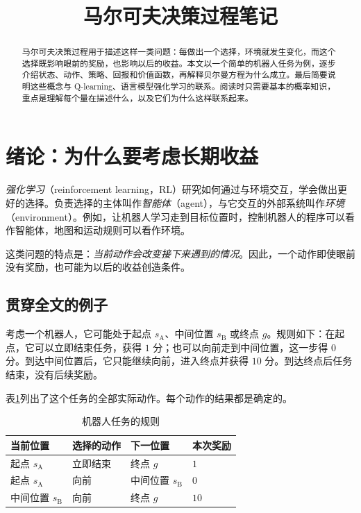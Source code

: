\documentclass[UTF8,12pt,a4paper,fontset=fandol]{ctexart}
\title{马尔可夫决策过程笔记}
\author{}
\date{}
\begin{document}
\maketitle

\begin{abstract}
马尔可夫决策过程用于描述这样一类问题：每做出一个选择，环境就发生变化，而这个选择既影响眼前的奖励，也影响以后的收益。本文以一个简单的机器人任务为例，逐步介绍状态、动作、策略、回报和价值函数，再解释贝尔曼方程为什么成立。最后简要说明这些概念与 Q-learning、语言模型强化学习的联系。阅读时只需要基本的概率知识，重点是理解每个量在描述什么，以及它们为什么这样联系起来。
\end{abstract}

\tableofcontents

\section{绪论：为什么要考虑长期收益}
\label{sec:mdp-introduction}

\emph{强化学习}（reinforcement learning，RL）研究如何通过与环境交互，学会做出更好的选择。负责选择的主体叫作\emph{智能体}（agent），与它交互的外部系统叫作\emph{环境}（environment）。例如，让机器人学习走到目标位置时，控制机器人的程序可以看作智能体，地图和运动规则可以看作环境。

这类问题的特点是：\emph{当前动作会改变接下来遇到的情况}。因此，一个动作即使眼前没有奖励，也可能为以后的收益创造条件。

\subsection{贯穿全文的例子}

考虑一个机器人，它可能处于起点 $s_{\mathrm A}$、中间位置 $s_{\mathrm B}$ 或终点 $g$。规则如下：在起点，它可以立即结束任务，获得 $1$ 分；也可以向前走到中间位置，这一步得 $0$ 分。到达中间位置后，它只能继续向前，进入终点并获得 $10$ 分。到达终点后任务结束，没有后续奖励。

表\ref{tab:mdp-example}列出了这个任务的全部实际动作。每个动作的结果都是确定的。
\begin{table}
  \centering
  \caption{机器人任务的规则}
  \label{tab:mdp-example}
  \begin{tabular}{llll}
    \toprule
    当前位置 & 选择的动作 & 下一位置 & 本次奖励 \\
    \midrule
    起点 $s_{\mathrm A}$ & 立即结束 & 终点 $g$ & $1$ \\
    起点 $s_{\mathrm A}$ & 向前 & 中间位置 $s_{\mathrm B}$ & $0$ \\
    中间位置 $s_{\mathrm B}$ & 向前 & 终点 $g$ & $10$ \\
    \bottomrule
  \end{tabular}
\end{table}
\end{document}
